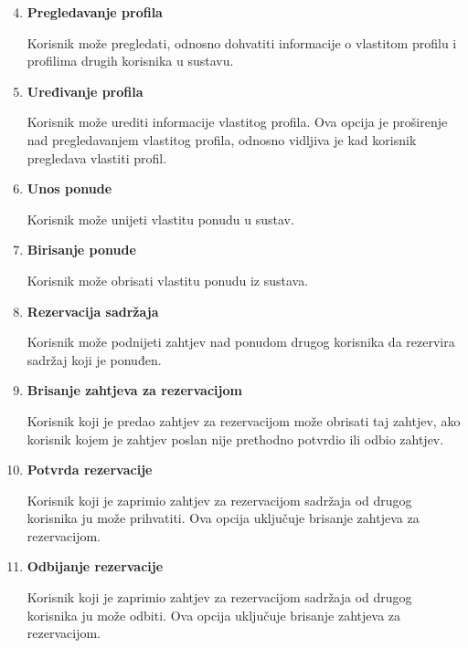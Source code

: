 \documentclass[times, utf8, zavrsni, numeric]{fer}
\newcommand{\razmakp}{\vspace{18pt}}
\newcommand{\razmaks}{\vspace{10pt}}
\newcommand{\uvlakas}{\hspace{0.5cm}}
\begin{document}
\razmaks
\begin{enumerate} \setcounter{enumi}{3}
  \item \textbf{Pregledavanje profila} \par
    \uvlakas Korisnik može pregledati, odnosno dohvatiti informacije o vlastitom profilu i profilima drugih korisnika u sustavu.

  \item \textbf{Uređivanje profila} \par
    \uvlakas Korisnik može urediti informacije vlastitog profila.
      Ova opcija je proširenje nad pregledavanjem vlastitog profila, odnosno vidljiva je kad korisnik pregledava vlastiti profil.

  \item \textbf{Unos ponude} \par
    \uvlakas Korisnik može unijeti vlastitu ponudu u sustav.

  \item \textbf{Birisanje ponude} \par
    \uvlakas Korisnik može obrisati vlastitu ponudu iz sustava.

  \item \textbf{Rezervacija sadržaja} \par
    \uvlakas Korisnik može podnijeti zahtjev nad ponudom drugog korisnika da rezervira sadržaj koji je ponuđen.

  \item \textbf{Brisanje zahtjeva za rezervacijom} \par
    \uvlakas Korisnik koji je predao zahtjev za rezervacijom može obrisati taj zahtjev, ako korisnik kojem je zahtjev poslan nije prethodno potvrdio ili odbio zahtjev.

  \item \textbf{Potvrda rezervacije} \par
    \uvlakas Korisnik koji je zaprimio zahtjev za rezervacijom sadržaja od drugog korisnika ju može prihvatiti.
      Ova opcija uključuje brisanje zahtjeva za rezervacijom.

  \item \textbf{Odbijanje rezervacije} \par
    \uvlakas Korisnik koji je zaprimio zahtjev za rezervacijom sadržaja od drugog korisnika ju može odbiti.
      Ova opcija uključuje brisanje zahtjeva za rezervacijom.

\end{enumerate}
\razmaks

\razmakp
\razmakp
\end{document}
